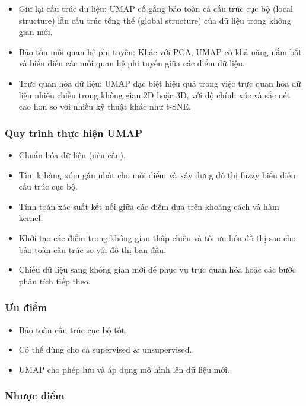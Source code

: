 \documentclass[
]{article}
\providecommand{\tightlist}{%
  \setlength{\itemsep}{0pt}\setlength{\parskip}{0pt}}
\begin{document}
\begin{itemize}
\item
  Giữ lại cấu trúc dữ liệu: UMAP cố gắng bảo toàn cả cấu trúc cục bộ
  (local structure) lẫn cấu trúc tổng thể (global structure) của dữ liệu
  trong không gian mới.
\item
  Bảo tồn mối quan hệ phi tuyến: Khác với PCA, UMAP có khả năng nắm bắt
  và biểu diễn các mối quan hệ phi tuyến giữa các điểm dữ liệu.
\item
  Trực quan hóa dữ liệu: UMAP đặc biệt hiệu quả trong việc trực quan hóa
  dữ liệu nhiều chiều trong không gian 2D hoặc 3D, với độ chính xác và
  sắc nét cao hơn so với nhiều kỹ thuật khác như t-SNE.
\end{itemize}

\subsubsection{Quy trình thực hiện
UMAP}\label{quy-truxecnh-thux1ef1c-hiux1ec7n-umap}

\begin{itemize}
\tightlist
\item
  Chuẩn hóa dữ liệu (nếu cần).
\item
  Tìm k hàng xóm gần nhất cho mỗi điểm và xây dựng đồ thị fuzzy biểu
  diễn cấu trúc cục bộ.
\item
  Tính toán xác suất kết nối giữa các điểm dựa trên khoảng cách và hàm
  kernel.
\item
  Khởi tạo các điểm trong không gian thấp chiều và tối ưu hóa đồ thị sao
  cho bảo toàn cấu trúc so với đồ thị ban đầu.
\item
  Chiếu dữ liệu sang không gian mới để phục vụ trực quan hóa hoặc các
  bước phân tích tiếp theo.
\end{itemize}

\subsubsection{Ưu điểm}\label{ux1b0u-ux111iux1ec3m-4}

\begin{itemize}
\tightlist
\item
  Bảo toàn cấu trúc cục bộ tốt.
\item
  Có thể dùng cho cả supervised \& unsupervised.
\item
  UMAP cho phép lưu và áp dụng mô hình lên dữ liệu mới.
\end{itemize}

\subsubsection{Nhược điểm}\label{nhux1b0ux1ee3c-ux111iux1ec3m-4}
\end{document}
